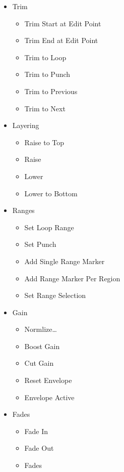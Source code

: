 \documentclass[10pt,a4paper]{book}
\begin{document}
{\begin{itemize}
\begin{itemize}
\item Set Sync Position
\item Remove Sync
\item Nudge Forward
\item Nudge Backward
\item Nudge Forward by Capture Offset
\item Nudge Backward by Capture Offset
\end{itemize}
\item Trim
\begin{itemize}
\item Trim Start at Edit Point
\item Trim End at Edit Point
\item Trim to Loop
\item Trim to Punch
\item Trim to Previous
\item Trim to Next
\end{itemize}
\item Layering
\begin{itemize}
\item Raise to Top
\item Raise
\item Lower
\item Lower to Bottom
\end{itemize}
\item Ranges
\begin{itemize}
\item Set Loop Range
\item Set Punch
\item Add Single Range Marker
\item Add Range Marker Per Region
\item Set Range Selection
\end{itemize}
\item Gain
\begin{itemize}
\item Normlize\ldots
\item Boost Gain
\item Cut Gain
\item Reset Envelope
\item Envelope Active
\end{itemize}
\item Fades
\begin{itemize}
\item Fade In
\item Fade Out
\item Fades

\end{itemize}
\end{itemize}}
\end{document}
